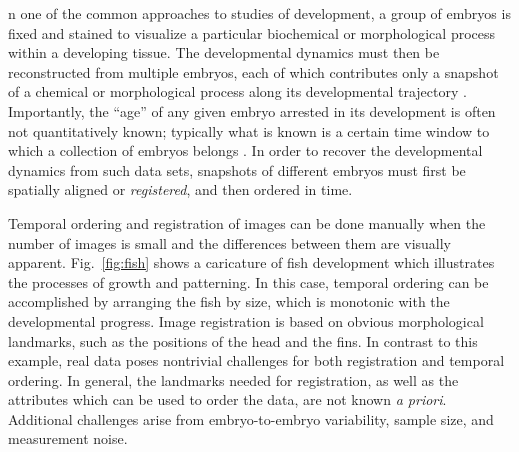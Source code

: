 \documentclass{pnastwo}
\newcommand{\fig}[0]{Fig.}
\begin{document}
\begin{article}




n one of the common approaches to studies of development, a group of embryos is fixed and stained to visualize a particular biochemical or morphological process within a developing tissue. 
%
The developmental dynamics must then be reconstructed from multiple embryos, each of which contributes only a snapshot of a chemical or morphological process along its developmental trajectory \cite{jaeger2004dynamic, peter2011gene, fowlkes2008quantitative}.
%
Importantly, the ``age'' of any given embryo arrested in its development is often not quantitatively known; typically what is known is
a certain time window to which a collection of embryos belongs \cite{ng2012large, richardson2014emage, castro2009automatic}.
%
In order to recover the developmental dynamics from such data sets, snapshots of different embryos must first be spatially aligned or {\em registered}, and then ordered in time.
%


Temporal ordering and registration of images can be done manually
when the number of images is small and the differences between them are visually apparent. 
%
\fig~\ref{fig:fish} shows a caricature of fish development which illustrates the processes of growth and patterning.
%
In this case, temporal ordering can be accomplished by arranging the fish by size, which is monotonic with the developmental progress.
%
Image registration is based on obvious morphological landmarks, such as the positions of the head and the fins.
%
In contrast to this example, real data poses nontrivial challenges for both registration and temporal ordering.
%
In general, the landmarks needed for registration, as well as the attributes which can be used to order the data, are not known {\it a priori}.
%
Additional challenges arise from embryo-to-embryo variability, sample size, and measurement noise.



\end{article}
\end{document}
